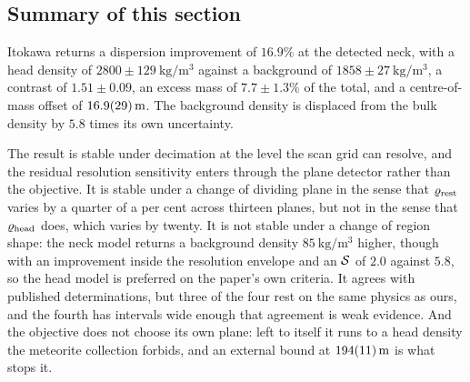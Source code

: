 \subsection{Summary of this section}
\label{sec:itokawa:summary}

Itokawa returns a dispersion improvement of $16.9\%$ at the detected
neck, with a head density of
$2800 \pm \SI{129}{\kilo\gram\per\cubic\metre}$ against a background of
$1858 \pm \SI{27}{\kilo\gram\per\cubic\metre}$, a contrast of
$1.51 \pm 0.09$, an excess mass of $7.7 \pm 1.3\%$ of the total, and a
centre-of-mass offset of $\SI{16.9+-2.9}{\metre}$. The background density
is displaced from the bulk density by $5.8$ times its own uncertainty.

The result is stable under decimation at the level the scan grid can
resolve, and the residual resolution sensitivity enters through the plane
detector rather than the objective. It is stable under a change of
dividing plane in the sense that $\varrho_{\mathrm{rest}}$ varies by a quarter of a per
cent across thirteen planes, but not in the sense that $\varrho_{\mathrm{head}}$ does,
which varies by twenty. It is not stable under a change of region shape:
the neck model returns a background density
$\SI{85}{\kilo\gram\per\cubic\metre}$ higher, though with an improvement
inside the resolution envelope and an $\mathcal{S}$ of $2.0$ against $5.8$, so
the head model is preferred on the paper's own criteria. It agrees with
published determinations, but three of the four rest on the same physics
as ours, and the fourth has intervals wide enough that agreement is weak
evidence. And the objective does not choose its own plane: left to itself
it runs to a head density the meteorite collection forbids, and an
external bound at $\SI{194+-11}{\metre}$ is what stops it.